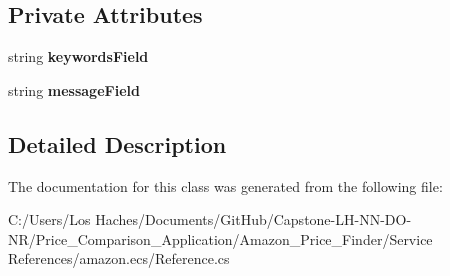 \subsection*{Private Attributes}
\begin{DoxyCompactItemize}
\item 
\hypertarget{class_price___comparison_1_1amazon_1_1ecs_1_1_corrected_query_a003729ff345ce99cbe99df3f50f7a83c}{string {\bfseries keywords\-Field}}\label{class_price___comparison_1_1amazon_1_1ecs_1_1_corrected_query_a003729ff345ce99cbe99df3f50f7a83c}

\item 
\hypertarget{class_price___comparison_1_1amazon_1_1ecs_1_1_corrected_query_acc266f109845944e1f0e1e6436118e42}{string {\bfseries message\-Field}}\label{class_price___comparison_1_1amazon_1_1ecs_1_1_corrected_query_acc266f109845944e1f0e1e6436118e42}

\end{DoxyCompactItemize}


\subsection{Detailed Description}


The documentation for this class was generated from the following file\-:\begin{DoxyCompactItemize}
\item 
C\-:/\-Users/\-Los Haches/\-Documents/\-Git\-Hub/\-Capstone-\/\-L\-H-\/\-N\-N-\/\-D\-O-\/\-N\-R/\-Price\-\_\-\-Comparison\-\_\-\-Application/\-Amazon\-\_\-\-Price\-\_\-\-Finder/\-Service References/amazon.\-ecs/Reference.\-cs\end{DoxyCompactItemize}
